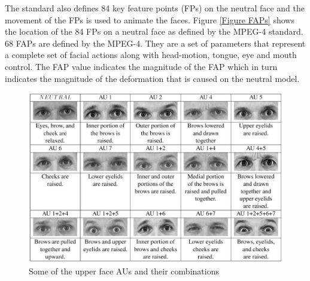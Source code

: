 \documentclass[11pt]{article}
\begin{document}
The standard also defines 84 key feature points (FPs) on the neutral face and the movement of the FPs is used to animate the faces. Figure \ref{Figure FAPs} shows the location of the 84 FPs on a neutral face as defined by the MPEG-4 standard.\\

68 FAPs are defined by the MPEG-4. They are a set of parameters that represent a complete set of facial actions along with head-motion, tongue, eye and mouth control. The FAP value indicates the magnitude of the FAP which in turn indicates the magnitude of the deformation that is caused on the neutral model.
\clearpage
\begin{figure}
   	\centerline{\includegraphics[scale=0.5]{./images/facs}}
   	\caption{\label{Figure FACs} Some of the upper face AUs and their combinations \citep{Tian01}}
\end{figure}
\end{document}

